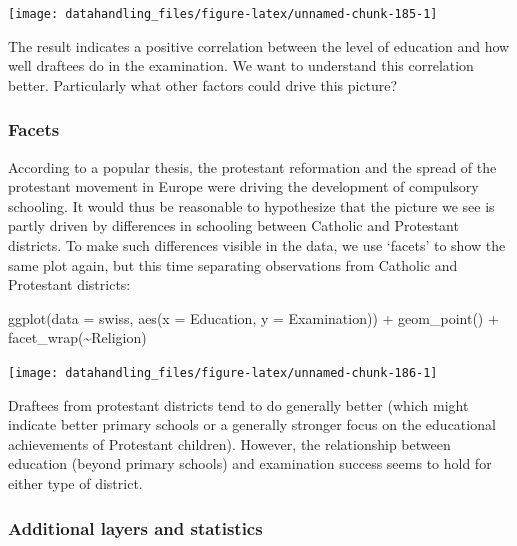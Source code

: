 \documentclass[
  12pt,
]{style/krantz}
\newenvironment{Shaded}{\begin{snugshade}}{\end{snugshade}}
\newcommand{\AttributeTok}[1]{\textcolor[rgb]{0.77,0.63,0.00}{#1}}
\newcommand{\FunctionTok}[1]{\textcolor[rgb]{0.00,0.00,0.00}{#1}}
\newcommand{\NormalTok}[1]{#1}
\newcommand{\SpecialCharTok}[1]{\textcolor[rgb]{0.00,0.00,0.00}{#1}}
\begin{document}
\texttt{[image: datahandling\_files/figure-latex/unnamed-chunk-185-1]}

The result indicates a positive correlation between the level of education and how well draftees do in the examination. We want to understand this correlation better. Particularly what other factors could drive this picture?

\hypertarget{facets}{%
\subsubsection{Facets}\label{facets}}

According to a popular thesis, the protestant reformation and the spread of the protestant movement in Europe were driving the development of compulsory schooling. It would thus be reasonable to hypothesize that the picture we see is partly driven by differences in schooling between Catholic and Protestant districts. To make such differences visible in the data, we use `facets' to show the same plot again, but this time separating observations from Catholic and Protestant districts:

\begin{Shaded}
\begin{Highlighting}[]
\FunctionTok{ggplot}\NormalTok{(}\AttributeTok{data =}\NormalTok{ swiss, }\FunctionTok{aes}\NormalTok{(}\AttributeTok{x =}\NormalTok{ Education, }\AttributeTok{y =}\NormalTok{ Examination)) }\SpecialCharTok{+}
     \FunctionTok{geom\_point}\NormalTok{() }\SpecialCharTok{+}
     \FunctionTok{facet\_wrap}\NormalTok{(}\SpecialCharTok{\textasciitilde{}}\NormalTok{Religion)}
\end{Highlighting}
\end{Shaded}

\texttt{[image: datahandling\_files/figure-latex/unnamed-chunk-186-1]}

Draftees from protestant districts tend to do generally better (which might indicate better primary schools or a generally stronger focus on the educational achievements of Protestant children). However, the relationship between education (beyond primary schools) and examination success seems to hold for either type of district.

\hypertarget{additional-layers-and-statistics}{%
\subsubsection{Additional layers and statistics}\label{additional-layers-and-statistics}}
\end{document}
